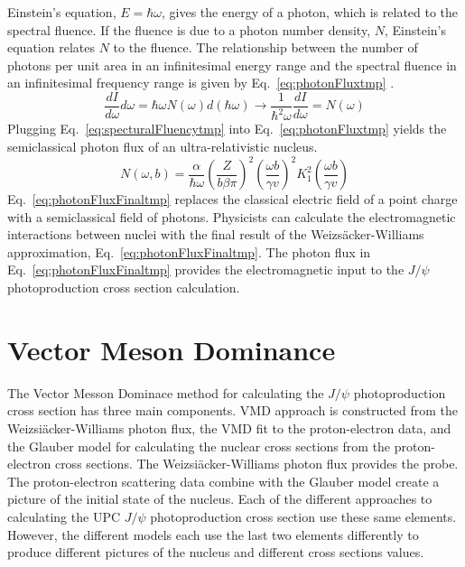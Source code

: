     Einstein's equation, $E=\hbar\omega$, gives the energy of a photon, which
      is related to the spectral fluence. 
    If the fluence is due to a photon number density, $N$, Einstein's equation
      relates $N$ to the fluence. 
    The relationship between the number of photons per unit area in an 
      infinitesimal energy range and the spectral fluence in an infinitesimal 
      frequency range is given by Eq.~\ref{eq:photonFluxtmp} \cite{WWJackson}.
    \begin{equation}  \label{eq:photonFluxtmp}
        \frac{dI}{d\omega}d\omega=\hbar\omega N(\omega)d(\hbar\omega)
         \rightarrow \frac{1}{\hbar^{2}\omega}\frac{dI}{d\omega}=N(\omega)
    \end{equation}
    Plugging Eq.~\ref{eq:specturalFluencytmp} into 
      Eq.~\ref{eq:photonFluxtmp} yields the semiclassical photon flux of an 
      ultra-relativistic nucleus.
    \begin{equation} \label{eq:photonFluxFinaltmp}
	N(\omega,b)=\frac{\alpha}{\hbar\omega}
	 \left(\frac{Z}{b\beta\pi}\right)^{2}
	 \left(\frac{\omega b}{\gamma v}\right)^{2}
	 K_{1}^{2}\left(\frac{\omega b}{\gamma v}\right)
    \end{equation}
    Eq.~\ref{eq:photonFluxFinaltmp} replaces the classical electric field of a 
      point charge with a semiclassical field of photons. 
    Physicists can calculate the electromagnetic interactions between nuclei 
      with the final result of the Weizs\"{a}cker-Williams approximation, 
      Eq.~\ref{eq:photonFluxFinaltmp}.
    The photon flux in Eq.~\ref{eq:photonFluxFinaltmp} provides the 
      electromagnetic input to the $J/\psi$ photoproduction cross section 
      calculation. 


  \section{\label{sec:vdmTheory}Vector Meson Dominance}
    The Vector Messon Dominace method for calculating the $J/\psi$
      photoproduction cross section has three main components.
    VMD approach is constructed from the Weizsi\"{a}cker-Williams photon
      flux, the VMD fit to the proton-electron data, and the Glauber model for 
      calculating the nuclear cross sections from the proton-electron cross 
      sections.
    The Weizsi\"{a}cker-Williams photon flux provides the probe. 
    The proton-electron scattering data combine with the Glauber model  
      create a picture of the initial state of the nucleus. 
    Each of the different approaches to calculating the UPC $J/\psi$ 
      photoproduction cross section use these same elements.
    However, the different models each use the last two elements differently 
      to produce different pictures of the nucleus and different cross 
      sections values. 

